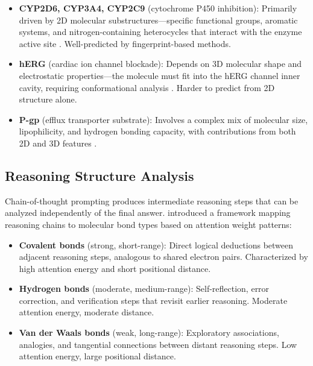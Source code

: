 \documentclass[11pt]{article}
\begin{document}
\begin{itemize}[leftmargin=*]
    \item \textbf{CYP2D6, CYP3A4, CYP2C9} (cytochrome P450 inhibition): Primarily driven by 2D molecular substructures---specific functional groups, aromatic systems, and nitrogen-containing heterocycles that interact with the enzyme active site \citep{guengerich2008cytochrome}. Well-predicted by fingerprint-based methods.

    \item \textbf{hERG} (cardiac ion channel blockade): Depends on 3D molecular shape and electrostatic properties---the molecule must fit into the hERG channel inner cavity, requiring conformational analysis \citep{sanguinetti2006herg}. Harder to predict from 2D structure alone.

    \item \textbf{P-gp} (efflux transporter substrate): Involves a complex mix of molecular size, lipophilicity, and hydrogen bonding capacity, with contributions from both 2D and 3D features \citep{lin2003role}.
\end{itemize}

\subsection{Reasoning Structure Analysis}

Chain-of-thought prompting \citep{wei2022chain} produces intermediate reasoning steps that can be analyzed independently of the final answer. \citet{chen2026molecular} introduced a framework mapping reasoning chains to molecular bond types based on attention weight patterns:

\begin{itemize}[leftmargin=*]
    \item \textbf{Covalent bonds} (strong, short-range): Direct logical deductions between adjacent reasoning steps, analogous to shared electron pairs. Characterized by high attention energy and short positional distance.

    \item \textbf{Hydrogen bonds} (moderate, medium-range): Self-reflection, error correction, and verification steps that revisit earlier reasoning. Moderate attention energy, moderate distance.

    \item \textbf{Van der Waals bonds} (weak, long-range): Exploratory associations, analogies, and tangential connections between distant reasoning steps. Low attention energy, large positional distance.
\end{itemize}
\end{document}
